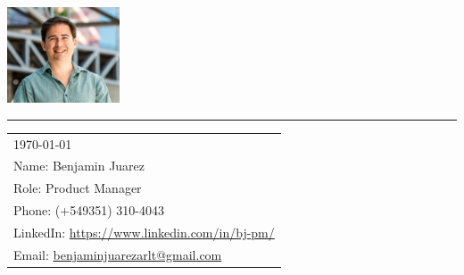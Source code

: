 \includegraphics[width=0.25\textwidth]{pic.png} %
\vspace{-1em} %
\rule{\linewidth}{1pt} %
\bigskip\bigskip %

\hfill

\begin{tabular}{l @{}} \today \midskip\\ 
	Name: Benjamin Juarez \\
	Role: Product Manager \\
	Phone: (+549351) 310-4043 \\
	LinkedIn: \href{https://www.linkedin.com/in/bj-pm/?locale=en_US}{https://www.linkedin.com/in/bj-pm/} \\
	Email: \href{benjaminjuarezarlt@gmail.com}{benjaminjuarezarlt@gmail.com} \\
\end{tabular}

\midskip 


\hfill%

